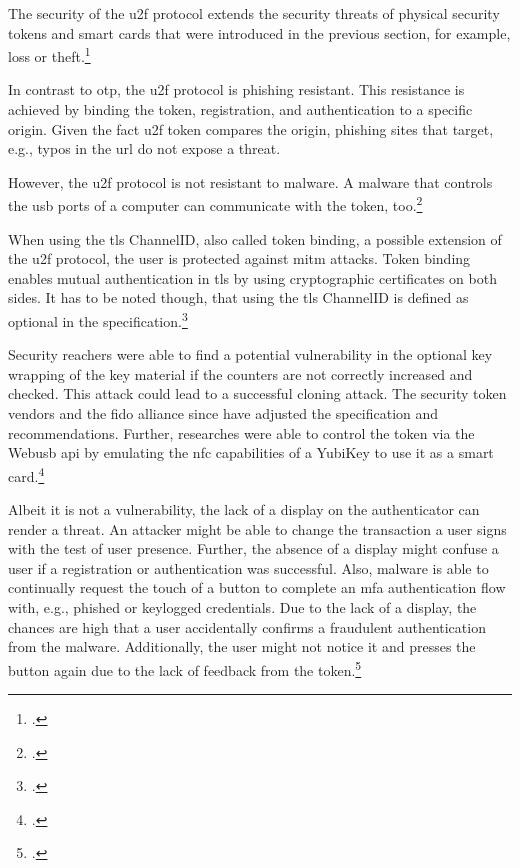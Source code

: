 The security of the \gls{u2f} protocol extends the security threats of physical security tokens and smart cards that were introduced in the previous section, for example, loss or theft.\footcites[See][12--13]{fido-sec-ref}

In contrast to \gls{otp}, the \gls{u2f} protocol is phishing resistant. This resistance is achieved by binding the token, registration, and authentication to a specific origin. Given the fact \gls{u2f} token compares the origin, phishing sites that target, e.g., typos in the \gls{url} do not expose a threat.

However, the \gls{u2f} protocol is not resistant to malware. A malware that controls the \gls{usb} ports of a computer can communicate with the token, too.\footcites[See][10--1]{8429292}[See][9]{u2f-overview}

When using the \gls{tls} ChannelID, also called token binding, a possible extension of the \gls{u2f} protocol, the user is protected against \gls{mitm} attacks. Token binding enables mutual authentication in \gls{tls} by using cryptographic certificates on both sides. It has to be noted though, that using the \gls{tls} ChannelID is defined as optional in the specification.\footcites[See][6--7]{u2f-overview}

Security reachers were able to find a potential vulnerability in the optional key wrapping of the key material if the counters are not correctly increased and checked. This attack could lead to a successful cloning attack. The security token vendors and the \gls{fido} alliance since have adjusted the specification and recommendations. Further, researches were able to control the token via the Web\gls{usb} \gls{api} by emulating the \gls{nfc} capabilities of a YubiKey to use it as a smart card.\footcites[See][3]{DBLP:journals/corr/abs-1906-06009}

Albeit it is not a vulnerability, the lack of a display on the authenticator can render a threat. An attacker might be able to change the transaction a user signs with the test of user presence. Further, the absence of a display might confuse a user if a registration or authentication was successful. Also, malware is able to continually request the touch of a button to complete an \gls{mfa} authentication flow with, e.g., phished or keylogged credentials. Due to the lack of a display, the chances are high that a user accidentally confirms a fraudulent authentication from the malware. Additionally, the user might not notice it and presses the button again due to the lack of feedback from the token.\footcites[See][434]{10.1007/978-3-662-54970-4_25}[See][15]{das2018johnny}[See][1518--1519]{238325}[See][884]{8418643}

